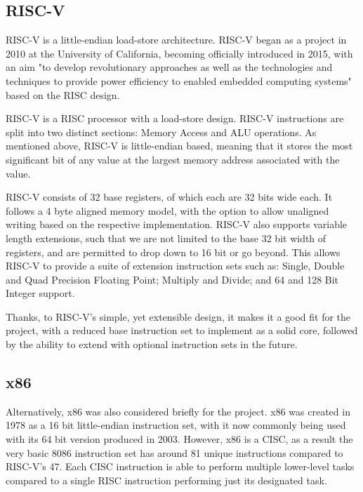 \subsection{RISC-V}
RISC-V \cite{waterman_2019_the} is a little-endian load-store architecture. RISC-V began as a project in 2010 at the University of California, becoming officially introduced in 2015, with an aim "to develop revolutionary approaches as well as the technologies and techniques to provide power efficiency to enabled embedded computing systems" \cite{riscvinternational_2018_history} based on the \ac{RISC} design.

RISC-V is a \ac{RISC} processor with a load-store design. RISC-V instructions are split into two distinct sections: Memory Access and \ac{ALU} operations. As mentioned above, RISC-V is little-endian based, meaning that it stores the most significant bit of any value at the largest memory address associated with the value.

RISC-V consists of 32 base registers, of which each are 32 bits wide each. It follows a 4 byte aligned memory model, with the option to allow unaligned writing based on the respective implementation. RISC-V also supports variable length extensions, such that we are not limited to the base 32 bit width of registers, and are permitted to drop down to 16 bit or go beyond. This allows RISC-V to provide a suite of extension instruction sets such as: Single, Double and Quad Precision Floating Point; Multiply and Divide; and 64 and 128 Bit Integer support.

Thanks, to RISC-V's simple, yet extensible design, it makes it a good fit for the project, with a reduced base instruction set to implement as a solid core, followed by the ability to extend with optional instruction sets in the future.

\subsection{x86}
Alternatively, x86 was also considered briefly for the project. x86 \cite{intelcorporation_2023_intel} was created in 1978 as a 16 bit little-endian instruction set, with it now commonly being used with its 64 bit version produced in 2003. However, x86 is a \ac{CISC}, as a result the very basic 8086 \cite{amd_1989_8086} instruction set has around 81 unique instructions compared to RISC-V's 47. Each \ac{CISC} instruction is able to perform multiple lower-level tasks compared to a single \ac{RISC} instruction performing just its designated task.

